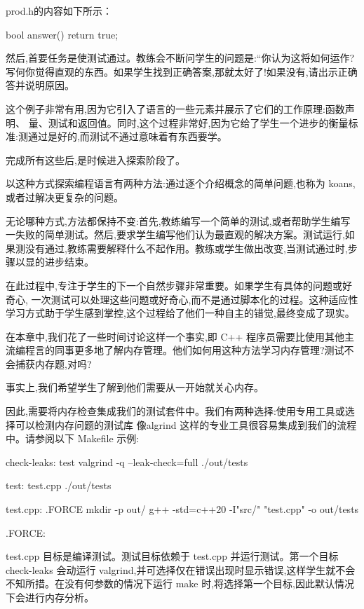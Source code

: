 prod.h的内容如下所示：

\begin{cpp}
bool answer(){
  return true;
}
\end{cpp}

然后,首要任务是使测试通过。教练会不断问学生的问题是:“你认为这将如何运作?写何你觉得直观的东西。如果学生找到正确答案,那就太好了!如果没有,请出示正确答并说明原因。

这个例子非常有用,因为它引入了语言的一些元素并展示了它们的工作原理:函数声明、 量、测试和返回值。同时,这个过程非常好,因为它给了学生一个进步的衡量标准:测通过是好的,而测试不通过意味着有东西要学。

完成所有这些后,是时候进入探索阶段了。


以这种方式探索编程语言有两种方法:通过逐个介绍概念的简单问题,也称为 koans,或者过解决更复杂的问题。

无论哪种方式,方法都保持不变:首先,教练编写一个简单的测试,或者帮助学生编写一失败的简单测试。然后,要求学生编写他们认为最直观的解决方案。测试运行,如果测没有通过,教练需要解释什么不起作用。教练或学生做出改变,当测试通过时,步骤以显的进步结束。

在此过程中,专注于学生的下一个自然步骤非常重要。如果学生有具体的问题或好奇心, 一次测试可以处理这些问题或好奇心,而不是通过脚本化的过程。这种适应性学习方式助于学生感到掌控,这个过程给了他们一种自主的错觉,最终变成了现实。


在本章中,我们花了一些时间讨论这样一个事实,即 C++ 程序员需要比使用其他主流编程言的同事更多地了解内存管理。他们如何用这种方法学习内存管理?测试不会捕获内存题,对吗? 

事实上,我们希望学生了解到他们需要从一开始就关心内存。 

因此,需要将内存检查集成我们的测试套件中。我们有两种选择:使用专用工具或选择可以检测内存问题的测试库 像algrind 这样的专业工具很容易集成到我们的流程中。请参阅以下 Makefile 示例:

\begin{shell}
check-leaks: test
  valgrind -q --leak-check=full ./out/tests

test: test.cpp
  ./out/tests

test.cpp: .FORCE
  mkdir -p out/
  g++ -std=c++20 -I"src/" "test.cpp" -o out/tests

.FORCE:
\end{shell}

test.cpp 目标是编译测试。测试目标依赖于 test.cpp 并运行测试。第一个目标 check-leaks 会动运行 valgrind,并可选择仅在错误出现时显示错误,这样学生就不会不知所措。在没有何参数的情况下运行 make 时,将选择第一个目标,因此默认情况下会进行内存分析。

